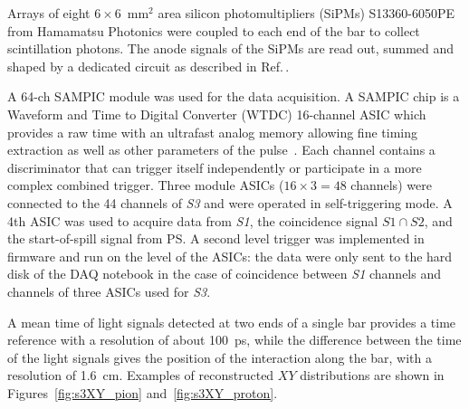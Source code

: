 Arrays of eight $6 \times 6$~mm$^2$ area silicon photomultipliers (SiPMs) S13360-6050PE from Hamamatsu Photonics \cite{Hamamatsu} were coupled to each end of the bar to collect scintillation photons.
The anode signals of the SiPMs are read out, summed and shaped by a dedicated circuit as described in Ref.\,\cite{S3-readout}.

A 64-ch SAMPIC  module was used for the data acquisition.
A SAMPIC chip is a Waveform and Time to Digital Converter (WTDC) 16-channel ASIC which provides a raw time with an ultrafast analog memory allowing fine timing extraction as well as other parameters of the pulse~\cite{SAMPIC}.
Each channel contains a discriminator that can trigger itself independently or participate in a more complex combined trigger. 
Three module ASICs ($16\times3=48$ channels) were connected to the 44 channels of \textit{S3} and were operated in self-triggering mode.
A 4th ASIC was used to acquire data from \textit{S1}, the coincidence signal $\mathit{S1} \cap \mathit{S2}$, and the start-of-spill signal from PS.
A second level trigger was implemented in firmware and run on the level of the ASICs: the data were only sent to the hard disk of the DAQ notebook in the case of coincidence between \textit{S1} channels and channels of three ASICs used for \textit{S3}.

A mean time of light signals detected at two ends of a single bar provides a time reference with a resolution of about 100~ps, while the difference between the time of the light signals gives the position of the interaction along the bar, with a resolution of 1.6~cm.
Examples of reconstructed $XY$ distributions are shown in Figures~\ref{fig:s3XY_pion} and~\ref{fig:s3XY_proton}.


